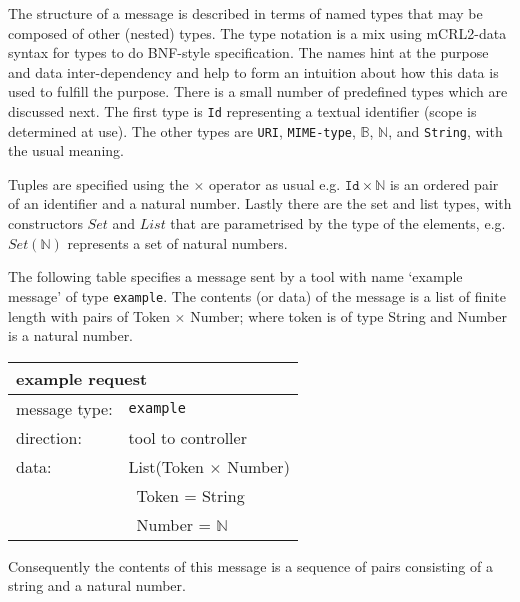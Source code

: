 \documentclass{article}
\newcommand{\msg}[1]{\texttt{#1}}
\begin{document}
   The structure of a message is described in terms of named types that may be
   composed of other (nested) types. The type notation is a mix using
   mCRL2-data syntax for types to do BNF-style specification.  The names hint
   at the purpose and data inter-dependency and help to form an intuition about
   how this data is used to fulfill the purpose.  There is a small number of
   predefined types which are discussed next. The first type is \texttt{Id}
   representing a textual identifier (scope is determined at use). The other
   types are \texttt{URI}, \texttt{MIME-type}, $\mathbb{B}$, $\mathbb{N}$,
   and \texttt{String}, with the usual meaning.

   Tuples are specified using the $\times$ operator as usual e.g. $\texttt{Id}
   \times \mathbb{N}$ is an ordered pair of an identifier and a natural number.
   Lastly there are the set and list types, with constructors $Set$ and $List$
   that are parametrised by the type of the elements, e.g.  $Set(\mathbb{N})$
   represents a set of natural numbers.
   
   The following table specifies a message sent by a tool with name `example
   message' of type \msg{example}.  The contents (or data) of the message is a
   list of finite length with pairs of Token $\times$ Number; where token is of
   type String and Number is a natural number.

   \begin{table}[H]
    \begin{center}
     \begin{tabular}{|ll|}
      \hline
       \multicolumn{2}{|l|}{\textbf{example request}} \\
      \hline
       message type:    & \msg{example} \\
      \hline
       direction:       & tool to controller \\
       data:            & List(Token $\times$ Number) \\
                        & \ Token  = String \\
                        & \ Number = $\mathbb{N}$ \\
      \hline
     \end{tabular}
     \vspace{-0.3cm}
    \end{center}
    \label{table:example_message}
   \end{table}
   \noindent Consequently the contents of this message is a sequence of pairs
   consisting of a string and a natural number.
\end{document}
